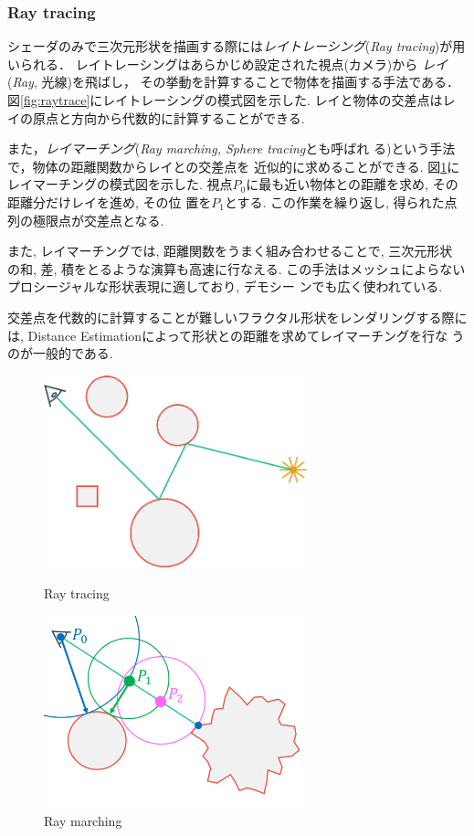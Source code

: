 \subsubsection{Ray tracing}

シェーダのみで三次元形状を描画する際には\emph{レイトレーシング}({\it Ray
tracing})が用いられる．
レイトレーシングはあらかじめ設定された視点(カメラ)から
\emph{レイ}({\it Ray}, 光線)を飛ばし，
その挙動を計算することで物体を描画する手法である．
図\ref{fig:raytrace}にレイトレーシングの模式図を示した.
レイと物体の交差点はレイの原点と方向から代数的に計算することができる.

また，\emph{レイマーチング}({\it Ray marching, Sphere tracing}とも呼ばれ
る)\cite{sphereTracing}という手法で，物体の距離関数からレイとの交差点を
近似的に求めることができる.
図\ref{fig:raymarch}にレイマーチングの模式図を示した.
視点$P_0$に最も近い物体との距離を求め, その距離分だけレイを進め, その位
置を$P_1$とする.
この作業を繰り返し, 得られた点列の極限点が交差点となる.

また, レイマーチングでは, 距離関数をうまく組み合わせることで, 三次元形状
の和, 差, 積をとるような演算も高速に行なえる.
この手法はメッシュによらないプロシージャルな形状表現に適しており, デモシー
ンでも広く使われている.

交差点を代数的に計算することが難しいフラクタル形状をレンダリングする際に
は, Distance Estimationによって形状との距離を求めてレイマーチングを行な
うのが一般的である.

 \begin{figure}[htbp]
  \begin{minipage}{0.5\hsize}
   \center
   \includegraphics[width=3in, keepaspectratio]{../img/fractal/raytrace.pdf}
   \caption{Ray tracing}
   \label{fig:raytrace}
  \end{minipage}
  \begin{minipage}{0.5\hsize}
   \center
   \includegraphics[width=3in, keepaspectratio]{../img/fractal/raymarching.pdf}
   \caption{Ray marching}
   \label{fig:raymarch}
  \end{minipage}
 \end{figure}

